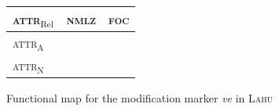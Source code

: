 \begin{figure}
\parbox[b]{\textwidth}{
\begin{center}
\begin{tabular}{| l || c | c |}
\cline{1-1}
\\
\hline
\textsc{attr}$_{\text{Rel}}$ & \textsc{nmlz} & \textsc{foc}\\
\hline
\textsc{attr}$_{\text{A}}$\\
\cline{1-1}
\textsc{attr}$_{\text{N}}$\\
\cline{1-1}
\end{tabular}
\end{center}
}
\caption[Functional map for modification marking]{Functional map for the modification marker \textit{ve} in \textsc{Lahu}}
\label{lahu funcmap}
\end{figure}

